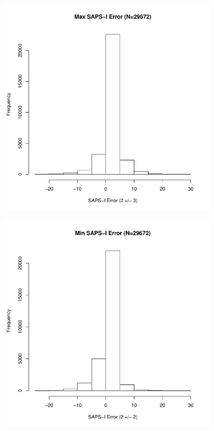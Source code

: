 \documentclass[10pt]{article}
\begin{document}
\begin{figure}
\centering
        \begin{subfigure}[b]{0.5\textwidth}
          \includegraphics[width=\linewidth]{../../figure/fig_hist_sapsi_max_err.pdf}
        \end{subfigure}%
        \begin{subfigure}[b]{0.5\textwidth}
          \includegraphics[width=\linewidth]{../../figure/fig_hist_sapsi_min_err.pdf}
        \end{subfigure}
\end{figure}
\end{document}
